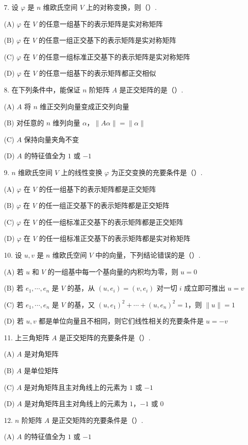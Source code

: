 \documentclass[UTF8, 12pt, fontset=fandol, oneside]{ctexart}
\begin{document}
7. 设 $\varphi$ 是 $n$ 维欧氏空间 $V$ 上的对称变换，则（\quad ）.

(A) $\varphi$ 在 $V$ 的任意一组基下的表示矩阵是实对称矩阵

(B) $\varphi$ 在 $V$ 的任意一组正交基下的表示矩阵是实对称矩阵

(C) $\varphi$ 在 $V$ 的任意一组标准正交基下的表示矩阵是实对称矩阵

(D) $\varphi$ 在 $V$ 的任意一组基下的表示矩阵都正交相似

8. 在下列条件中，能保证 $n$ 阶矩阵 $A$ 是正交矩阵的是（\quad ）.

(A) $A$ 将 $n$ 维正交列向量变成正交列向量

(B) 对任意的 $n$ 维列向量 $\alpha$，$\|A\alpha\|=\|\alpha\|$

(C) $A$ 保持向量夹角不变

(D) $A$ 的特征值全为 $1$ 或 $-1$

9. $n$ 维欧氏空间 $V$ 上的线性变换 $\varphi$ 为正交变换的充要条件是（\quad ）.

(A) $\varphi$ 在 $V$ 的任一组基下的表示矩阵都是正交矩阵

(B) $\varphi$ 在 $V$ 的任一组正交基下的表示矩阵都是正交矩阵

(C) $\varphi$ 在 $V$ 的任一组标准正交基下的表示矩阵都是正交矩阵

(D) $\varphi$ 在 $V$ 的任一组标准正交基下的表示矩阵都是实对称矩阵

10. 设 $u,v$ 是 $n$ 维欧氏空间 $V$ 中的向量，下列结论错误的是（\quad ）.

(A) 若 $u$ 和 $V$ 的一组基中每一个基向量的内积均为零，则 $u=0$

(B) 若 $e_1,\cdots,e_n$ 是 $V$ 的基，从 $(u,e_i)=(v,e_i)$ 对一切 $i$ 成立即可推出 $u=v$

(C) 若 $e_1,\cdots,e_n$ 是 $V$ 的基，又 $(u,e_1)^2+\cdots+(u,e_n)^2=1$，则 $\|u\|=1$

(D) 若 $u,v$ 都是单位向量且不相同，则它们线性相关的充要条件是 $u=-v$

11. 上三角矩阵 $A$ 是正交矩阵的充要条件是（\quad ）.

(A) $A$ 是对角矩阵

(B) $A$ 是单位矩阵

(C) $A$ 是对角矩阵且主对角线上的元素为 $1$ 或 $-1$

(D) $A$ 是对角矩阵且主对角线上的元素为 $1$，$-1$ 或 $0$

12. $n$ 阶矩阵 $A$ 是正交矩阵的充要条件是（\quad ）.

(A) $A$ 的特征值全为 $1$ 或 $-1$
\end{document}
